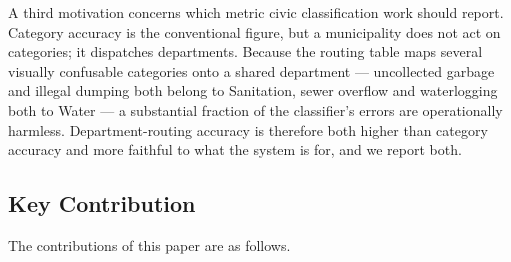\documentclass[conference]{IEEEtran}
\begin{document}
A third motivation concerns which metric civic classification work should report. Category accuracy is the conventional figure, but a municipality does not act on categories; it dispatches departments. Because the routing table maps several visually confusable categories onto a shared department --- uncollected garbage and illegal dumping both belong to Sanitation, sewer overflow and waterlogging both to Water --- a substantial fraction of the classifier's errors are operationally harmless. Department-routing accuracy is therefore both higher than category accuracy and more faithful to what the system is for, and we report both.

\subsection{Key Contribution}
The contributions of this paper are as follows.
\end{document}
